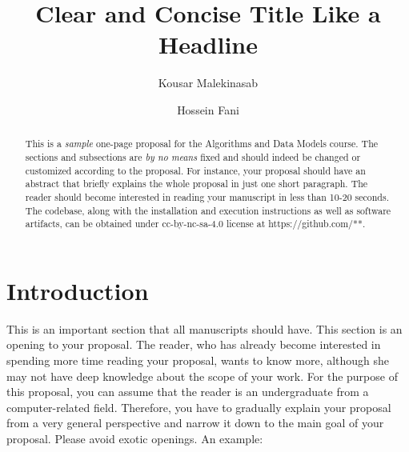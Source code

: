 \documentclass[sigconf]{acmart}
\begin{document}
\title{Clear and Concise Title Like a Headline }
\author{Kousar Malekinasab}
\author{Hossein Fani}

\begin{abstract}
{\color{blue}This is a \textit{sample} one-page proposal for the Algorithms and Data Models course. The sections and subsections are \textit{by no means} fixed and should indeed be changed or customized according to the proposal. For instance, your proposal should have an abstract that briefly explains the whole proposal in just one short paragraph. The reader should become interested in reading your manuscript in less than 10-20 seconds. The codebase, along with the installation and execution instructions as well as software artifacts, can be obtained under cc-by-nc-sa-4.0 license at https://github.com/**.}
\end{abstract}

\maketitle

\section{Introduction}
{\color{blue}This is an important section that all manuscripts should have. This section is an opening to your proposal. The reader, who has already become interested in spending more time reading your proposal, wants to know more, although she may not have deep knowledge about the scope of your work. For the purpose of this proposal, you can assume that the reader is an undergraduate from a computer-related field. Therefore, you have to gradually explain your proposal from a very general perspective and narrow it down to the main goal of your proposal. Please avoid exotic openings. An example:}
\end{document}
